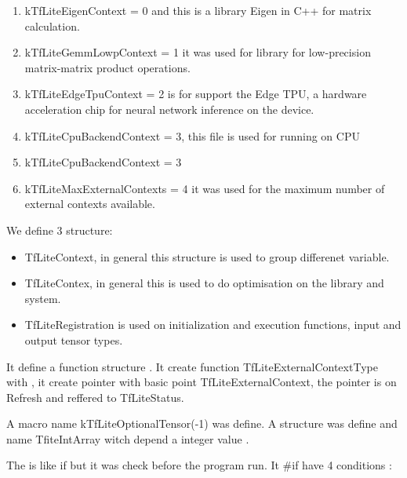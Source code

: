 \begin{enumerate}	
    \item kTfLiteEigenContext = 0 and this is a library Eigen in C++ for matrix calculation.
    \item kTfLiteGemmLowpContext = 1 it was used for library  for low-precision matrix-matrix product operations.
    \item kTfLiteEdgeTpuContext = 2 is for support the Edge TPU, a hardware acceleration chip for neural network inference on the device.
    \item kTfLiteCpuBackendContext = 3, this file  is used for running on CPU
    \item kTfLiteCpuBackendContext = 3
    \item kTfLiteMaxExternalContexts = 4 it was used for the maximum number of external contexts available.
\end{enumerate}

We define 3 structure: 
\begin{itemize}
    \item TfLiteContext, in general this structure is used to group differenet variable. 
    \item TfLiteContex, in general this is used to do optimisation on the library and system. 
    \item TfLiteRegistration is used on initialization and execution functions, input and output tensor types. 
\end{itemize}

\begin{center}
    \label{Figure:Comatibily}
\end{center}

It define a function structure . It create function TfLiteExternalContextType with , it create pointer with basic point TfLiteExternalContext, the pointer is on Refresh and reffered to TfLiteStatus. 

A macro name kTfLiteOptionalTensor(-1)  was define. A structure was define and name TfiteIntArray witch depend a integer value .

The  is like if but it was check before the program run. It \#if have 4 conditions : 

